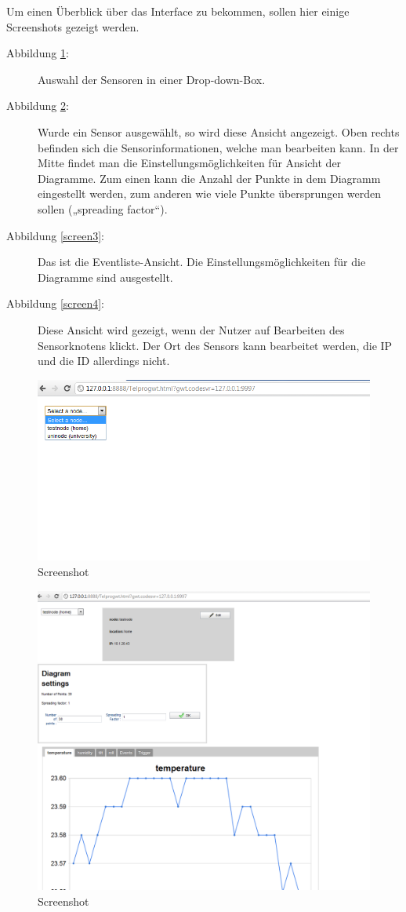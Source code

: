 \documentclass[12pt,a4paper,twoside]{article}
\begin{document}
Um einen Überblick über das Interface zu bekommen, sollen hier einige Screenshots gezeigt  werden.   
\begin{description}
\item[Abbildung \ref{screen1}:] Auswahl der Sensoren in einer Drop-down-Box. 
\item[Abbildung \ref{screen2}:] Wurde ein Sensor ausgewählt, so wird diese Ansicht angezeigt. Oben rechts befinden sich die Sensorinformationen, welche man bearbeiten kann. In der Mitte findet man die Einstellungsmöglichkeiten für Ansicht der Diagramme. Zum einen kann die Anzahl der Punkte in dem Diagramm eingestellt werden, zum anderen wie viele Punkte übersprungen werden sollen („spreading factor“).
\item[Abbildung \ref{screen3}:] Das ist die Eventliste-Ansicht. Die Einstellungsmöglichkeiten für die Diagramme sind ausgestellt.
\item[Abbildung \ref{screen4}:] Diese Ansicht wird gezeigt, wenn der Nutzer auf Bearbeiten des Sensorknotens klickt. Der Ort des Sensors kann bearbeitet werden, die IP und die ID allerdings nicht.
\end{description}

\begin{figure}[htbp]
   \centering
   \includegraphics[width=12cm]{fig/screen1.png}
   \caption{Screenshot}
   \label{screen1}
\end{figure}

\begin{figure}[htbp]
   \centering
   \includegraphics[width=12cm]{fig/screen2.png}
   \caption{Screenshot}
   \label{screen2}
\end{figure}
\end{document}
